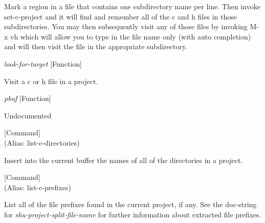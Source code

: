 \begin{doc-string}
Mark a region in a file that contains one subdirectory name per line.
Then invoke set-c-project and it will find and remember all of the c and h
files in those subdirectories.  You may then subsequently visit any of
those files by invoking M-x vh which will allow you to type in the file
name only (with auto completion) and will then visit the file in the
appropriate subdirectory.
\end{doc-string}

\vspace{1em}
\noindent
{}
\usebox{\funcname}\emph{look-for-target}
 \hfill [Function]

\begin{doc-string}
Visit a c or h file in a project.
\end{doc-string}

\vspace{1em}
\noindent
{}
\usebox{\funcname}\emph{pbuf}
 \hfill [Function]

\begin{doc-string}
Undocumented
\end{doc-string}

\vspace{1em}
\noindent
{}
\usebox{\funcname}
 \hfill [Command]\\%
 (Alias: list-c-directories)

\begin{doc-string}
Insert into the current buffer the names of all of the directories in a project.
\end{doc-string}

\vspace{1em}
\noindent
{}
\usebox{\funcname}
 \hfill [Command]\\%
 (Alias: list-c-prefixes)

\begin{doc-string}
List all of the file prefixes found in the current project, if any.
See the doc-string for \emph{shu-project-split-file-name} for further information
about extracted file prefixes.
\end{doc-string}

